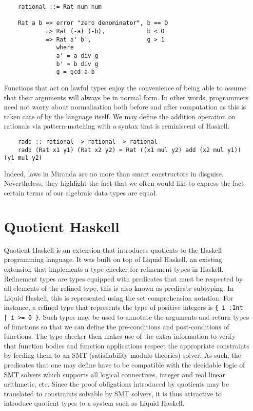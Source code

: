 \documentclass[12pt,twoside,maitrise]{dms}
\theoremstyle{definition}
\numberwithin{equation}{section}
\numberwithin{table}{chapter}
\numberwithin{figure}{chapter}
\newcommand\fn[1] {\texttt{#1}}
\begin{document}
\begin{verbatim}
    rational ::= Rat num num

    Rat a b => error "zero denominator", b == O
            => Rat (-a) (-b),            b < O
            => Rat a' b',                g > 1
               where
               a' = a div g
               b' = b div g
               g = gcd a b
\end{verbatim}

Functions that act on lawful types enjoy the convenience of being able to assume
that their arguments will always be in normal form. In other words, programmers
need not worry about normalisation both before and after computation as this is
taken care of by the language itself. We may define the addition operation on
rationals via pattern-matching with a syntax that is reminiscent of Haskell.

\begin{verbatim}
    radd :: rational -> rational -> rational
    radd (Rat x1 y1) (Rat x2 y2) = Rat ((x1 mul y2) add (x2 mul y1)) (y1 mul y2)
\end{verbatim}

Indeed, laws in Miranda are no more than smart constructors in disguise.
Nevertheless, they highlight the fact that we often would like to express the
fact certain terms of our algebraic data types are equal.

\section{Quotient Haskell}\label{sec:related-qit}

Quotient Haskell\cite{hewer2023quotient} is an extension that introduces
quotients to the Haskell programming language. It was built on top of Liquid
Haskell\cite{vazou2016liquid}, an existing extension that implements a type
checker for refinement types in Haskell. Refinement types are types equipped
with predicates that must be respected by all elements of the refined type, this
is also known as predicate subtyping. In Liquid Haskell, this is represented
using the set comprehension notation. For instance, a refined type that
represents the type of positive integers is \fn{\{ i :\@ Int | i >= 0 \}}.
Such types may be used to annotate the arguments and return types of functions
so that we can define the pre-conditions and post-conditions of functions. The
type checker then makes use of the extra information to verify that function
bodies and function applications respect the appropriate constraints by feeding
them to an SMT (satisfiability modulo theories) solver. As such, the predicates
that one may define have to be compatible with the decidable logic of SMT
solvers which supports all logical connectives, integer and real linear
arithmetic, etc. Since the proof obligations introduced by quotients may be
translated to constraints solvable by SMT solvers, it is thus attractive to
introduce quotient types to a system such as Liquid Haskell.
\end{document}
